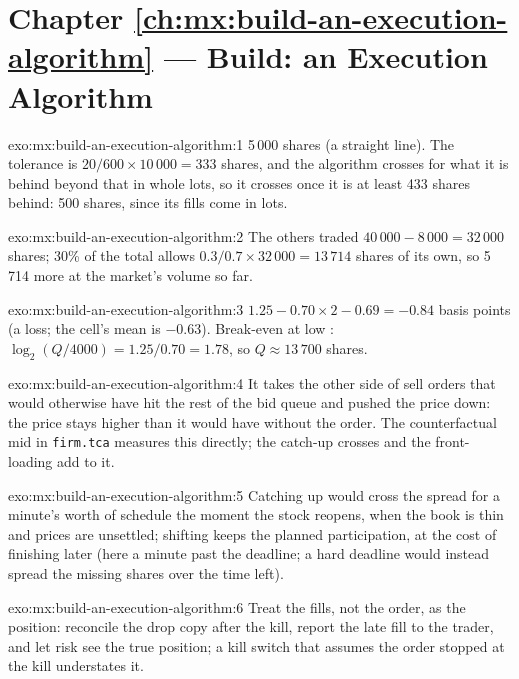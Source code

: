 \section*{Chapter \ref{ch:mx:build-an-execution-algorithm} --- Build: an Execution Algorithm}

\begin{solution}{exo:mx:build-an-execution-algorithm:1}
5\,000 shares (a straight line). The tolerance is $20/600\times10\,000=333$ shares, and the algorithm crosses for what it is behind beyond that in
whole lots, so it crosses once it is at least 433 shares behind: 500 shares, since its fills come in lots.
\end{solution}

\begin{solution}{exo:mx:build-an-execution-algorithm:2}
The others traded $40\,000-8\,000=32\,000$ shares; 30\% of the total allows $0.3/0.7\times32\,000=13\,714$ shares of its own, so 5\,714 more at
the market's volume so far.
\end{solution}

\begin{solution}{exo:mx:build-an-execution-algorithm:3}
$1.25-0.70\times2-0.69=-0.84$ basis points (a loss; the cell's mean is $-0.63$). Break-even at low : $\log_2(Q/4000)=1.25/0.70=1.78$, so
$Q\approx13\,700$ shares.
\end{solution}

\begin{solution}{exo:mx:build-an-execution-algorithm:4}
It takes the other side of sell orders that would otherwise have hit the rest of the bid queue and pushed the price down: the price stays higher than
it would have without the order. The counterfactual mid in \texttt{firm.tca} measures this directly; the catch-up crosses and the front-loading add
to it.
\end{solution}

\begin{solution}{exo:mx:build-an-execution-algorithm:5}
Catching up would cross the spread for a minute's worth of schedule the moment the stock reopens, when the book is thin and prices are unsettled;
shifting keeps the planned participation, at the cost of finishing later (here a minute past the deadline; a hard deadline would instead spread the
missing shares over the time left).
\end{solution}

\begin{solution}{exo:mx:build-an-execution-algorithm:6}
Treat the fills, not the order, as the position: reconcile the drop copy after the kill, report the late fill to the trader, and let risk see the true
position; a kill switch that assumes the order stopped at the kill understates it.
\end{solution}

